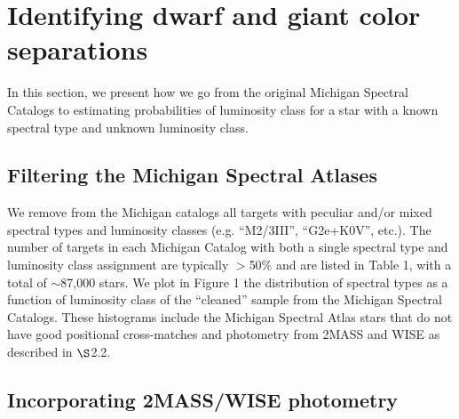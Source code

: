 \chapter{Identifying dwarf and giant color separations} \label{chap:METHODS}

In this section, we present how we go from the original Michigan Spectral Catalogs to estimating probabilities of luminosity class for a star with a known spectral type and unknown luminosity class.

\section{Filtering the Michigan Spectral Atlases} \label{sec:clean_michigan}

We remove from the Michigan catalogs all targets with peculiar and/or mixed spectral types and luminosity classes (e.g. ``M2/3III'', ``G2e+K0V'', etc.).  The  number of targets in each Michigan Catalog with both a single spectral type and luminosity class assignment are typically $>$50\% and are listed in Table 1, with a total of $\sim$87,000 stars. We plot in Figure 1 the distribution of spectral types as a function of luminosity class of the ``cleaned'' sample from the Michigan Spectral Catalogs.  These histograms include the Michigan Spectral Atlas stars that do not have good positional cross-matches and photometry from 2MASS and WISE as described in ${\S}$2.2.
\section{Incorporating 2MASS/WISE photometry}

